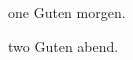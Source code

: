 \documentclass[one-per-page, backs]{flashcards}
\begin{document}
\begin{flashcard}{one}
   Guten morgen.
\end{flashcard}

\begin{flashcard}{two}
   Guten abend.
\end{flashcard}
\end{document}
